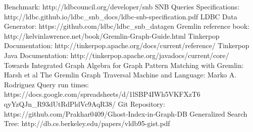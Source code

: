 \documentclass[
11pt, %
oneside, %
english, %
singlespacing, %
toctotoc, %
headsepline, %
]{MastersDoctoralThesis} %
\begin{document}


\mainmatter %

\pagestyle{thesis} %









% 


\appendix %



%
%





\begin{thebibliography}{99}

 Benchmark: http://ldbcouncil.org/developer/snb
 SNB Queries Specifications: http://ldbc.github.io/ldbc\_snb\_docs/ldbc-snb-specification.pdf
 LDBC Data Generator: https://github.com/ldbc/ldbc\_snb\_datagen
 Gremlin reference book: http://kelvinlawrence.net/book/Gremlin-Graph-Guide.html
 Tinkerpop Documentation: http://tinkerpop.apache.org/docs/current/reference/
 Tinkerpop Java Documentation: http://tinkerpop.apache.org/javadocs/current/core/
 Towards Integrated Graph Algebra for Graph Pattern Matching with Gremlin: Harsh et al
 The Gremlin Graph Traversal Machine and Language: Marko A. Rodriguez
 Query run times: https://docs.google.com/spreadsheets/d/1lSBP4IWh5VKFXzT6
\\
qyYzQJn\_R93dUtRdPldVc9AqR38/
 Git Repository: https://github.com/Prakhar0409/Ghost-Index-in-Graph-DB
 Generalized Search Tree: http://db.cs.berkeley.edu/papers/vldb95-gist.pdf


\end{thebibliography}
\end{document}

